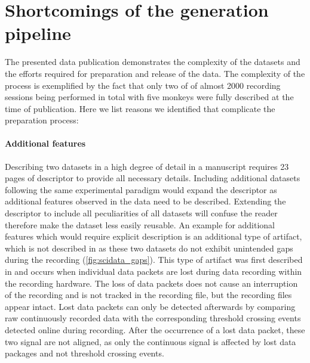 \section{Shortcomings of the  generation pipeline}
\label{sec:scidata_shortcomings}
The presented data publication demonstrates the complexity of the datasets and the efforts required for preparation and release of the data. The complexity of the process is exemplified by the fact that only two of of almost 2000 recording sessions being performed in total with five monkeys were fully described at the time of publication. Here we list reasons we identified that complicate the preparation process:

\paragraph{Additional features}
\label{sec:additional_features_gaps}
Describing two datasets in a high degree of detail in a manuscript requires 23 pages of descriptor to provide all necessary details. Including additional datasets following the same experimental paradigm would expand the descriptor as additional features observed in the data need to be described. Extending the descriptor to include all peculiarities of all datasets will confuse the reader therefore make the dataset less easily reusable.
An example for additional features which would require explicit description is an additional type of artifact, which is not described in \citet{Brochier_2018} as these two datasets do not exhibit unintended gaps during the recording (\cref{fig:scidata_gaps}). This type of artifact was first described in \citet{Sprenger_2014} and occurs when individual data packets are lost during data recording within the recording hardware. The loss of data packets does not cause an interruption of the recording and is not tracked in the recording file, but the recording files appear intact. Lost data packets can only be detected afterwards by comparing raw continuously recorded data with the corresponding threshold crossing events detected online during recording. After the occurrence of a lost data packet, these two signal are not aligned, as only the continuous signal is affected by lost data packages and not threshold crossing events.
